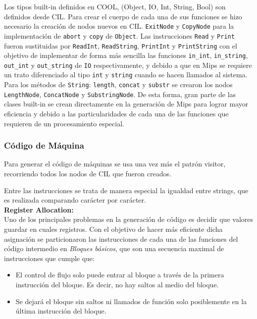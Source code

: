 \documentclass[11pt]{scrartcl} %
\begin{document}
Los tipos built-in definidos en COOL, (Object, IO, Int, String, Bool) son definidos desde CIL. Para crear el cuerpo de cada una de sus funciones se hizo necesario la creación de nodos nuevos en CIL. \texttt{ExitNode} y \texttt{CopyNode} para la implementación de \texttt{abort} y \texttt{copy} de \texttt{Object}. Las instrucciones \texttt{Read} y \texttt{Print} fueron sustituidas por \texttt{ReadInt}, \texttt{ReadString}, \texttt{PrintInt} y \texttt{PrintString} con el objetivo de implementar de forma más sencilla las funciones \texttt{in\_int}, \texttt{in\_string}, \texttt{out\_int} y \texttt{out\_string} de \texttt{IO} respectivamente, y debido a que en Mips se requiere un trato diferenciado al tipo \texttt{int} y \texttt{string} cuando se hacen llamados al sistema. Para los métodos de \texttt{String}: \texttt{length}, \texttt{concat} y \texttt{substr} se crearon los nodos \texttt{LengthNode}, \texttt{ConcatNode} y \texttt{SubstringNode}. De esta forma, gran parte de las clases built-in se crean directamente en la generación de Mips para lograr mayor eficiencia y debido a las particularidades de cada una de las funciones que requieren de un procesamiento especial. 

\subsubsection{Código de Máquina}

Para generar el código de máquinas se usa una vez más el patrón visitor, recorriendo todos los nodos de CIL que fueron creados.

Entre las instrucciones se trata de manera especial la igualdad entre strings, que es realizada comparando carácter por carácter.\\

\textbf{Register Allocation:}\\

Uno de los principales problemas en la generación de código es decidir que valores guardar en cuales registros. Con el objetivo de hacer más eficiente dicha asignación se particionaron las instrucciones de cada una de las funciones del código intermedio en \textit{Bloques básicos}, que son una secuencia maximal de instrucciones que cumple que:
\begin{itemize}
	\item El control de flujo solo puede entrar al bloque a través de la primera instrucción del bloque. Es decir, no hay saltos al medio del bloque.
	\item Se dejará el bloque sin saltos ni llamados de función solo posiblemente en la última instrucción del bloque.
\end{itemize}
\end{document}
